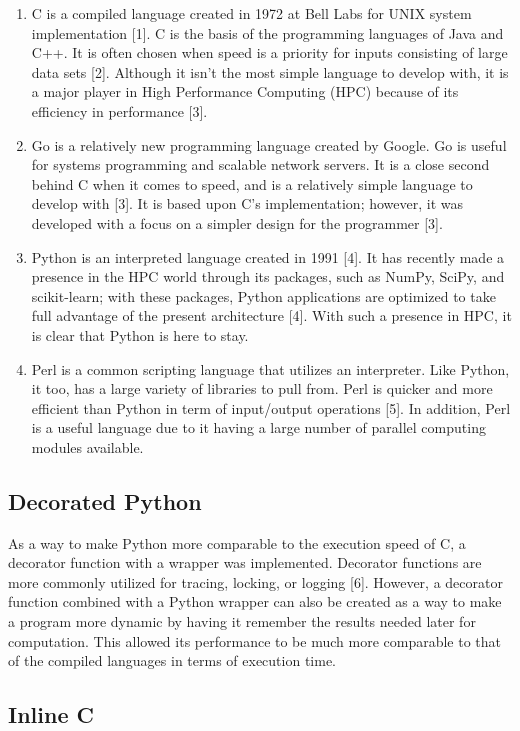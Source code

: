 \documentclass{sig-alternate}
\begin{document}
\begin{enumerate}
\item {\em}C is a compiled language created in 1972 at Bell Labs for UNIX system implementation [1]. C is the basis of the programming languages of Java and C++. It is often chosen when speed is a priority for inputs consisting of large data sets [2]. Although it isn't the most simple language to develop with, it is a major player in High Performance Computing (HPC) because of its efficiency in performance [3].
\item {\em}Go is a relatively new programming language created by Google. Go is useful for systems programming and scalable network servers. It is a close second behind C when it comes to speed, and is a relatively simple language to develop with [3]. It is based upon C's implementation; however, it was developed with a focus on a simpler design for the programmer [3]. 
\item {\em}Python is an interpreted language created in 1991 [4]. It has recently made a presence in the HPC world through its packages, such as NumPy, SciPy, and scikit-learn; with these packages, Python applications are optimized to take full 
advantage of the present architecture [4]. With such a presence in HPC, it is clear that Python is here to stay.
\item  {\em}Perl is a common scripting language that utilizes an interpreter. Like Python, it too, has a large variety of libraries to pull from. Perl is quicker and more efficient than Python in term of input/output operations [5]. In addition, Perl is a useful language due to it having a large number of parallel computing modules available.
\end{enumerate}


\subsection{Decorated Python}

As a way to make Python more comparable to the execution speed of C, a decorator function with a wrapper was implemented. Decorator functions are more commonly utilized for tracing, locking, or logging [6]. However, a decorator function combined with a Python wrapper can also be created as a way to make a program more dynamic by having it remember the results needed later for computation. This allowed its performance to be much more comparable to that of the compiled languages in terms of execution time.

\subsection{Inline C}
\end{document}
